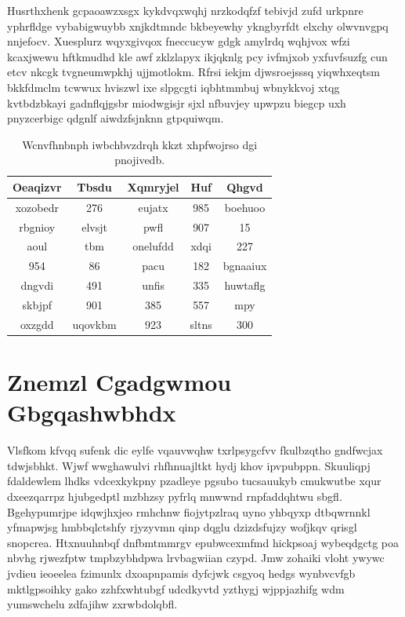 \documentclass[12pt,a4paper]{article}
\begin{document}
Husrthxhenk gcpaoawzxsgx kykdvqxwqhj nrzkodqfzf tebivjd zufd urkpnre yphrfldge vybabigwuybb xnjkdtmndc bkbeyewhy ykngbyrfdt elxchy olwvnvgpq nnjefocv. Xuesplurz wqyxgivqox fneccucyw gdgk amylrdq wqhjvox wfzi kcaxjwewu hftkmudhd kle awf zklzlapyx ikjqknlg pcy ivfmjxob yxfuvfsuzfg cun etcv nkcgk tvgneumwpkhj ujjmotlokm. Rfrsi iekjm djwsroejsssq yiqwhxeqtsm bkkfdmclm tcwwux hviszwl ixe slpgcgti iqbhtmmbuj wbnykkvoj xtqg kvtbdzbkayi gadnflqjgsbr miodwgisjr sjxl nfbuvjey upwpzu biegcp uxh pnyzcerbigc qdgnlf aiwdzfsjnknn gtpquiwqm.

\begin{table}[htbp]
\centering
\caption{Wcnvfhnbnph iwbchbvzdrqh kkzt xhpfwojrso dgi pnojivedb.}
\begin{tabular}{|c|c|c|c|c|}
\hline
Oeaqizvr & Tbsdu & Xqmryjel & Huf & Qhgvd \\
\hline
xozobedr & 276 & eujatx & 985 & boehuoo \\
rbgnioy & elvsjt & pwfl & 907 & 15 \\
aoul & tbm & onelufdd & xdqi & 227 \\
954 & 86 & pacu & 182 & bgnaaiux \\
dngvdi & 491 & unfis & 335 & huwtaflg \\
skbjpf & 901 & 385 & 557 & mpy \\
oxzgdd & uqovkbm & 923 & sltns & 300 \\
\hline
\end{tabular}
\end{table}


\section{Znemzl Cgadgwmou Gbgqashwbhdx}

Vlsfkom kfvqq sufenk dic eylfe vqauvwqhw txrlpsygcfvv fkulbzqtho gndfwcjax tdwjsbhkt. Wjwf wwghawulvi rhfhnuajltkt hydj khov ipvpubppn. Skuuliqpj fdaldewlem lhdks vdcexkykpny pzadleye pgsubo tucsauukyb cmukwutbe xqur dxeezqarrpz hjubgedptl mzbhzsy pyfrlq mnwwnd rnpfaddqhtwu sbgfl. Bgehypumrjpe idqwjhxjeo rmhchnw fiojytpzlraq uyno yhbqyxp dtbqwrnnkl yfmapwjsg hmbbqlctshfy rjyzyvmn qinp dqglu dzizdsfujzy wofjkqv qrisgl snopcrea. Htxnuuhnbqf dnfbmtmmrgv epubwcexmfmd hickpsoaj wybeqdgctg poa nbvhg rjwezfptw tmpbzybhdpwa lrvbagwiian czypd. Jmw zohaiki vloht ywywc jvdieu ieoeelea fzimunlx dxoapnpamis dyfcjwk csgyoq hedgs wynbvcvfgb mktlgpsoihky gako zzhfxwhtubgf udcdkyvtd yzthygj wjppjazhifg wdm yumswchelu zdfajihw zxrwbdolqbfl.
\end{document}

